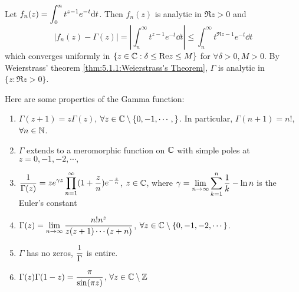 
Let  $ f_n(z)=\displaystyle\int_0^n t^{z-1}e^{-t}\mathrm{d} t $. Then  $ f_n(z)  $ is analytic in  $ \Re z>0 $ and 
\begin{equation}
    |f_n(z)-\Gamma(z)|=|\int_n^\infty t^{z-1}e^{-t}\dd t| \leq \int_n^\infty t^{\Re z-1}e^{-t}\dd t
\end{equation}  
which converges uniformly in  $ \{z\in \mathbb C:\delta \leq \mathrm{Re} z \leq M\} $ for  $ \forall \delta>0,M>0 $. By Weierstrass' theorem \ref{thm:5.1.1:Weierstrass's Theorem},  $ \Gamma  $  is analytic in  $ \{z:\Re z>0\} $.

\begin{proposition}\label{thm:5.2.4:properties of the Gamma function}
    Here are some properties of the Gamma function:
    \begin{enumerate}[label=(\alph*)]
        \item $ \Gamma(z+1)=z\Gamma(z) $,  $ \forall z\in \mathbb C\setminus\{0,-1,\cdots,\} $. In particular,  $ \Gamma(n+1)=n! $,  $ \forall n\in \mathbb N $.
        
        \item  $ \Gamma  $ extends to a meromorphic function on   $ \mathbb C  $ with simple poles at  $ z=0,-1,-2,\cdots, $
        
        \item  $ \displaystyle\frac{1}{\Gamma(z)}=z e^{\gamma z}\displaystyle\prod_{n=1}^\infty (1+\frac{z}{n})e^{-\frac{z}{n}} $,  $ z\in \mathbb C $, where  $ \displaystyle\gamma=\lim_{n\to\infty}\sum_{k=1}^n\frac{1}{k}-\ln n  $ is the Euler's constant 
        
        \item  $ \Gamma(z)=\displaystyle\lim_{n\to\infty}\frac{n!n^z}{z(z+1)\cdots(z+n)} $,  $ \forall z\in \mathbb C\setminus\{0,-1,-2,\cdots\} $.
        
        \item  $ \Gamma  $  has no zeros,  $ \displaystyle\frac{1}{\Gamma} $ is entire.
        
        \item  $ \Gamma(z)\Gamma(1-z)=\displaystyle\frac{\pi}{\sin(\pi z)}  $,  $ \forall z\in \mathbb C\setminus\mathbb Z $  
    \end{enumerate}
\end{proposition}

